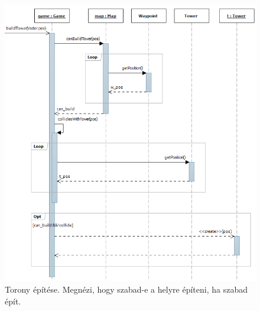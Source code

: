 \begin{figure}[H]
\begin{center}
\includegraphics[width=480px]{images/ch04/build_tower.png}
\caption{Torony építése. Megnézi, hogy szabad-e a helyre építeni, ha szabad épít.}
\label{fig:building_tower}
\end{center}
\end{figure}

